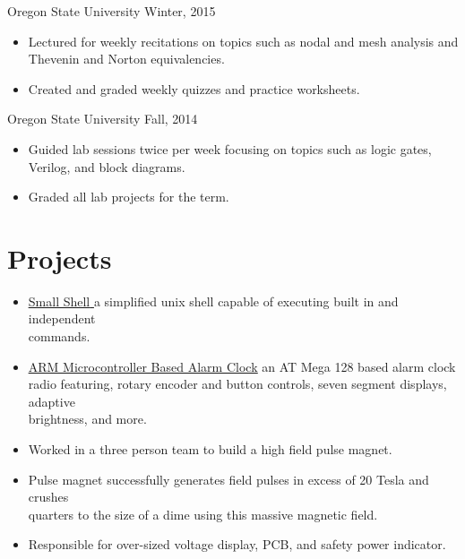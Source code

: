 \documentclass[]{friggeri-cv}
\begin{document}
         {Oregon State University}
         {Winter, 2015}
         \begin{itemize}
           \item Lectured for weekly recitations on topics such as nodal and mesh 
                 analysis and Thevenin and Norton equivalencies.
           \item Created and graded weekly quizzes and practice worksheets.
         \end{itemize}

         {Oregon State University}
         {Fall, 2014}
         \begin{itemize}
           \item Guided lab sessions twice per week focusing on topics such as logic
                 gates, Verilog, and block diagrams.
           \item Graded all lab projects for the term.
         \end{itemize}


\section{Projects}  
\vspace{-2mm}
         \begin{itemize}
           \item \href{https://github.com/reedjosh/small_shell/blob/master/smallsh.c}{\underline{Small Shell} }
                 a simplified unix shell capable of executing built in and independent \\ commands. 
           \item \href{https://github.com/reedjosh/arm_microcontroller_radio/blob/master/lab4/lab4.c}{\underline{ARM Microcontroller Based Alarm Clock}}
                an AT Mega 128 based alarm clock radio featuring, rotary encoder and button controls, seven segment displays, adaptive \\brightness, and more.
         \end{itemize} 

         \begin{itemize}
           \item Worked in a three person team to build a high field pulse magnet.
           \item Pulse magnet successfully generates field pulses in excess of 20 Tesla and 
                 crushes \\ quarters to the size of a dime using this massive magnetic field.
           \item Responsible for over-sized voltage display, PCB, and safety power indicator.
         \end{itemize} 
    
\end{document}
